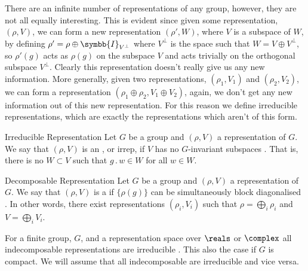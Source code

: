 \documentclass[fleqn]{NotesClass}
\newcommand{\identityMatrix}{\symbb{I}}
\newcommand{\action}{\mathbin{.}}
\begin{document}
    There are an infinite number of representations of any group, however, they are not all equally interesting.
    This is evident since given some representation, \((\rho, V)\), we can form a new representation \((\rho', W)\), where \(V\) is a subspace of \(W\), by defining \(\rho' = \rho \oplus \identityMatrix_{V^\perp}\) where \(V^{\perp}\) is the space such that \(W = V \oplus V^{\perp}\), so \(\rho'(g)\) acts as \(\rho(g)\) on the subspace \(V\) and acts trivially on the orthogonal subspace \(V^{\perp}\).
    Clearly this representation doesn't really give us any new information.
    More generally, given two representations, \((\rho_1, V_1)\) and \((\rho_2, V_2)\), we can form a representation \((\rho_1 \oplus \rho_2, V_1 \oplus V_2)\), again, we don't get any new information out of this new representation.
    For this reason we define irreducible representations, which are exactly the representations which aren't of this form.
    
    \begin{dfn}{Irreducible Representation}{}
        Let \(G\) be a group and \((\rho, V)\) a representation of \(G\).
        We say that \((\rho, V)\) is an , or irrep, if \(V\) has no \(G\)-invariant subspaces \cite{hamermesh}.
        That is, there is no \(W \subset V\) such that \(g \action w \in W\) for all \(w \in W\).
    \end{dfn}

    \begin{dfn}{Decomposable Representation}{}
        Let \(G\) be a group and \((\rho, V)\) a representation of \(G\).
        We say that \((\rho, V)\) is a  if \(\{\rho(g)\}\) can be simultaneously block diagonalised \cite{hamermesh}.
        In other words, there exist representations \((\rho_i, V_i)\) such that \(\rho = \bigoplus_i \rho_i\) and \(V = \bigoplus_i V_i\).
    \end{dfn}
    
    For a finite group, \(G\), and a representation space over \(\reals\) or \(\complex\) all indecomposable representations are irreducible \cite{hamermesh}.
    This also the case if \(G\) is compact.
    We will assume that all indecomposable are irreducible and vice versa.
    
\end{document}
